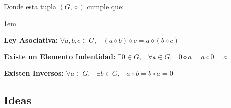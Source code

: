 \documentclass[12pt, fleqn]{report}                             %
\newenvironment{Indentation}[1][0.75em]                         %
    {\begin{adjustwidth}{#1}{}}                                     %
    {\end{adjustwidth}}                                             %
\DeclareMathOperator \Space {\quad}                             %
\DeclareMathOperator \MiniSpace {\;}                            %
\begin{document}
                Donde esta tupla $(G, \diamond)$ cumple que:
                \begin{Indentation}[1em]
                \begin{itemize}
                \small{
                    
                    \item 
                        \textbf{Ley Asociativa:}
                        $\forall a, b, c \in G, \MiniSpace
                            (a \diamond b) \diamond c = a \diamond (b \diamond c)$

                    \item 
                        \textbf{Existe un Elemento Indentidad:}
                        $\exists 0 \in G, \MiniSpace
                            \forall a \in G, \MiniSpace 0 \diamond a = a \diamond 0 = a$

                    \item 
                        \textbf{Existen Inversos:}
                        $\forall a \in G, \MiniSpace
                                \exists b \in G, \MiniSpace
                                    a \diamond b = b \diamond a = 0$

                }
                \end{itemize}
                \end{Indentation}

           
            \subsection{Ideas}
\end{document}
